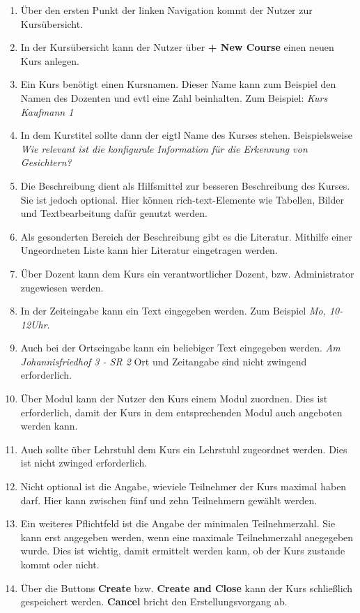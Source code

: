     \begin{enumerate}
     \item Über den ersten Punkt der linken Navigation kommt der Nutzer zur Kursübersicht.
     \item In der Kursübersicht kann der Nutzer über \textbf{+ New Course} einen neuen Kurs anlegen.
     \item Ein Kurs benötigt einen Kursnamen. Dieser Name kann zum Beispiel den Namen des Dozenten und evtl eine Zahl beinhalten. Zum Beispiel: \textit{Kurs Kaufmann 1}
     \item In dem Kurstitel sollte dann der eigtl Name des Kurses stehen. Beispielsweise \textit{Wie relevant ist die konfigurale Information für die Erkennung von Gesichtern?}
     \item Die Beschreibung dient als Hilfsmittel zur besseren Beschreibung des Kurses. Sie ist jedoch optional.
	   Hier können rich-text-Elemente wie Tabellen, Bilder und Textbearbeitung dafür genutzt werden.
     \item Als gesonderten Bereich der Beschreibung gibt es die Literatur. Mithilfe einer Ungeordneten Liste kann hier Literatur eingetragen werden.
     \item Über Dozent kann dem Kurs ein verantwortlicher Dozent, bzw. Administrator zugewiesen werden.
     \item In der Zeiteingabe kann ein Text eingegeben werden. Zum Beispiel \textit{Mo, 10-12Uhr}. 
     \item Auch bei der Ortseingabe kann ein beliebiger Text eingegeben werden. \textit{Am Johannisfriedhof 3 - SR 2}
	   Ort und Zeitangabe sind nicht zwingend erforderlich.
     \item Über Modul kann der Nutzer den Kurs einem Modul zuordnen. Dies ist erforderlich, damit der Kurs in dem entsprechenden Modul auch angeboten werden kann.
     \item Auch sollte über Lehrstuhl dem Kurs ein Lehrstuhl zugeordnet werden. Dies ist nicht zwinged erforderlich.
     \item Nicht optional ist die Angabe, wieviele Teilnehmer der Kurs maximal haben darf. Hier kann zwischen fünf und zehn Teilnehmern gewählt werden.
     \item Ein weiteres Pflichtfeld ist die Angabe der minimalen Teilnehmerzahl. Sie kann erst angegeben werden, wenn eine maximale Teilnehmerzahl anegegeben wurde.
	   Dies ist wichtig, damit ermittelt werden kann, ob der Kurs zustande kommt oder nicht.
     \item Über die Buttons \textbf{Create} bzw. \textbf{Create and Close} kann der Kurs schließlich gespeichert werden. \textbf{Cancel} bricht den Erstellungsvorgang ab.
    \end{enumerate}

